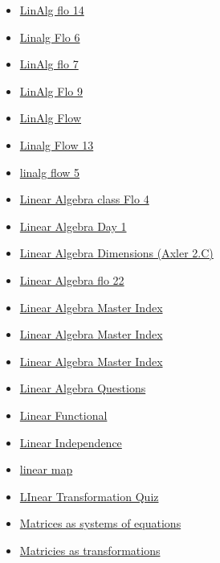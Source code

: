 \documentclass[11pt]{article}
\begin{document}
\begin{itemize}
\begin{itemize}
\begin{itemize}
\item \href{mathematics/linear\_algebra/KBe20math530flo14.org}{LinAlg flo 14}
\item \href{mathematics/linear\_algebra/KBe20math530flo6.org}{Linalg Flo 6}
\item \href{mathematics/linear\_algebra/KBe20math530flo7.org}{LinAlg flo 7}
\item \href{mathematics/linear\_algebra/KBe20math530flo9.org}{LinAlg Flo 9}
\item \href{mathematics/linear\_algebra/KBe2020math530flo3.org}{LinAlg Flow}
\item \href{mathematics/linear\_algebra/KBe20math530flo13.org}{Linalg Flow 13}
\item \href{mathematics/linear\_algebra/KBe20math530flo5.org}{linalg flow 5}
\item \href{mathematics/linear\_algebra/KBe20math530flo4.org}{Linear Algebra class Flo 4}
\item \href{mathematics/linear\_algebra/KBe2020math530flo1.org}{Linear Algebra Day 1}
\item \href{mathematics/linear\_algebra/KBeRefLinAlgDimension.org}{Linear Algebra Dimensions (Axler 2.C)}
\item \href{mathematics/linear\_algebra/KBe20math530flo22.org}{Linear Algebra flo 22}
\item \href{mathematics/linear\_algebra/KBxLinAlgMasterIndex.org}{Linear Algebra Master Index}
\item \href{mathematics/linear\_algebra/index.org}{Linear Algebra Master Index}
\item \href{mathematics/linear\_algebra/KBe2020math530index.org}{Linear Algebra Master Index}
\item \href{mathematics/linear\_algebra/KBe20math530floQuestions.org}{Linear Algebra Questions}
\item \href{mathematics/linear\_algebra/KBrefLinearFunctional.org}{Linear Functional}
\item \href{mathematics/linear\_algebra/KB20math530refLinearIndependence.org}{Linear Independence}
\item \href{mathematics/linear\_algebra/KBrefLinearMap.org}{linear map}
\item \href{mathematics/linear\_algebra/KBe20math530retLinearTransformationQuiz.org}{LInear Transformation Quiz}
\item \href{mathematics/linear\_algebra/KBe2020math530floMatriciesSystemsEquations.org}{Matrices as systems of equations}
\item \href{mathematics/linear\_algebra/KBE2020math501floMatriciesAsTransformations.org}{Matricies as transformations}

\end{itemize}
\end{itemize}
\end{itemize}
\end{document}
